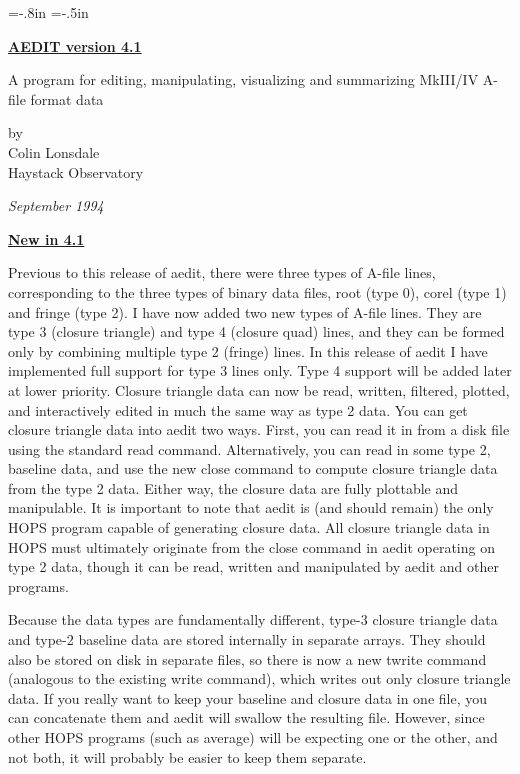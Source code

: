 \title{}
\author{}
\addtolength{\textwidth}{1.5in}
\addtolength{\textheight}{1in}
\hoffset=-.8in
\voffset=-.5in
\setlength{\parindent}{0in}


\pagestyle{empty}

\begin{center}
\Huge\bf
\underline{AEDIT version 4.1}
\vspace{2in}

\Large\rm
A program for editing, manipulating, visualizing and summarizing
MkIII/IV A-file format data
\vspace{2in}

by \\
Colin Lonsdale \\
Haystack Observatory \\
\vspace{.3in}

\em September 1994
\end{center}
\newpage

\begin{center}
\large\bf
\underline{New in 4.1}
\end{center}

Previous to this release of aedit, there were three types of A-file lines, 
corresponding to the three types of binary data files, root (type 0), 
corel (type 1) and fringe (type 2).  I have now added two new types of A-file 
lines.  They are type 3 (closure triangle) and type 4 (closure quad) lines, 
and they can be formed only by combining multiple type 2 (fringe) lines.  In 
this release of aedit I have implemented full support for type 3 lines only.  
Type 4 support will be added later at lower priority.  Closure triangle data 
can now be read, written, filtered, plotted, and interactively edited in much 
the same way as type 2 data.  You can get closure triangle data into aedit 
two ways.  First, you can read it in from a disk file using the standard read 
command.  Alternatively, you can read in some type 2, baseline data, and use 
the new close command to compute closure triangle data from the type 2 data.  
Either way, the closure data are fully plottable and manipulable.  It is 
important to note that aedit is (and should remain) the only HOPS program 
capable of generating closure data.  All closure triangle data in HOPS must 
ultimately originate from the close command in aedit operating on type 2 data, 
though it can be read, written and manipulated by aedit and other programs.


Because the data types are fundamentally different, type-3 closure triangle 
data and type-2 baseline data are stored internally in separate arrays.  They 
should also be stored on disk in separate files, so there is now a new twrite 
command (analogous to the existing write command), which writes out only closure 
triangle data.  If you really want to keep your baseline and closure data in one 
file, you can concatenate them and aedit will swallow the resulting file.  However, 
since other HOPS programs (such as average) will be expecting one or the other, 
and not both, it will probably be easier to keep them separate.

